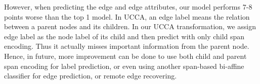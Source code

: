 However, when predicting the edge and edge attributes, our model
performs 7-8 points worse than the top 1 model. In UCCA, an edge label
means the relation between a parent nodes and its children. In our
UCCA transformation, we assign edge label as the node label of its
child and then predict with only child span encoding. Thus it actually
misses important information from the parent node. Hence, in future,
more improvement can be done to use both child and parent span
encoding for label prediction, or even using another span-based
bi-affine classifier for edge prediction, or remote edge recovering.

